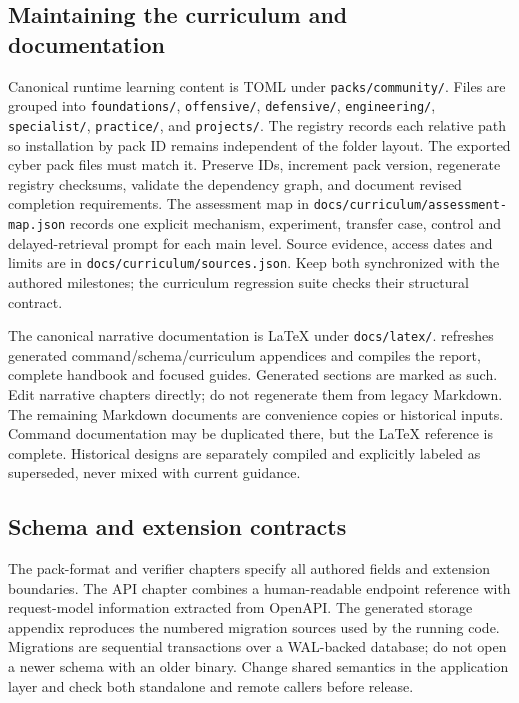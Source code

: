 \subsection{Maintaining the curriculum and documentation}
Canonical runtime learning content is TOML under \texttt{packs/community/}.
Files are grouped into \texttt{foundations/}, \texttt{offensive/},
\texttt{defensive/}, \texttt{engineering/}, \texttt{specialist/},
\texttt{practice/}, and \texttt{projects/}. The registry records each relative
path so installation by pack ID remains independent of the folder layout.
The exported cyber pack files must match it. Preserve IDs, increment pack version,
regenerate registry checksums, validate the dependency graph, and document revised
completion requirements. The assessment map in
\texttt{docs/curriculum/assessment-map.json} records one explicit mechanism,
experiment, transfer case, control and delayed-retrieval prompt for each main
level. Source evidence, access dates and limits are in
\texttt{docs/curriculum/sources.json}. Keep both synchronized with the authored
milestones; the curriculum regression suite checks their structural contract.

The canonical narrative documentation is LaTeX under \texttt{docs/latex/}.
 refreshes generated command/schema/curriculum
appendices and compiles the report, complete handbook and focused guides.
Generated sections are marked as such. Edit narrative chapters directly; do not
regenerate them from legacy Markdown. The remaining Markdown documents are
convenience copies or historical inputs. Command documentation may be duplicated
there, but the LaTeX reference is complete. Historical designs are separately
compiled and explicitly labeled as superseded, never mixed with current guidance.

\subsection{Schema and extension contracts}
The pack-format and verifier chapters specify all authored fields and extension
boundaries. The API chapter combines a human-readable endpoint reference with
request-model information extracted from OpenAPI. The generated storage appendix
reproduces the numbered migration sources used by the running code. Migrations
are sequential transactions over a WAL-backed database; do not open a newer
schema with an older binary. Change shared semantics in the application layer and
check both standalone and remote callers before release.


